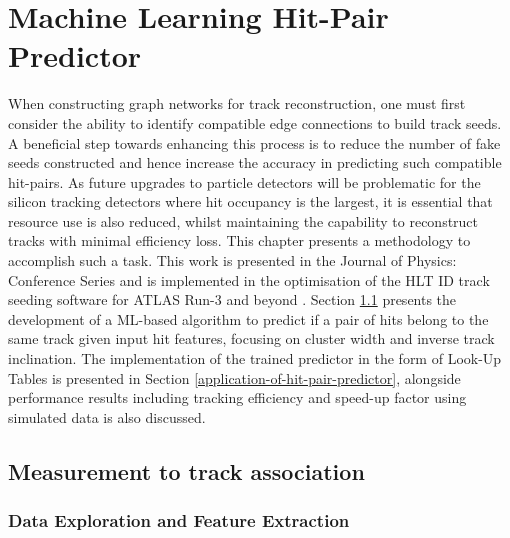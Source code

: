 

\doublespacing
\newpage
\chapter{Machine Learning Hit-Pair Predictor} 
\label{chapter-4}



When constructing graph networks for track reconstruction, one must first consider the ability to identify compatible edge connections to build track seeds. A beneficial step towards enhancing this process is to reduce the number of fake seeds constructed and hence increase the accuracy in predicting such compatible hit-pairs. As future upgrades to particle detectors will be problematic for the silicon tracking detectors where hit occupancy is the largest, it is essential that resource use is also reduced, whilst maintaining the capability to reconstruct tracks with minimal efficiency loss. This chapter presents a methodology to accomplish such a task. This work is presented in the Journal of Physics: Conference Series \cite{Lad_2023} and is implemented in the optimisation of the HLT ID track seeding software for ATLAS Run-3 and beyond \cite{Grandi:2728111, Long:2813981}. Section \ref{measurement-to-track-association} presents the development of a ML-based algorithm to predict if a pair of hits belong to the same track given input hit features, focusing on cluster width and inverse track inclination. The implementation of the trained predictor in the form of Look-Up Tables is presented in Section \ref{application-of-hit-pair-predictor}, alongside performance results including tracking efficiency and speed-up factor using simulated data is also discussed.


\section{Measurement to track association}
\label{measurement-to-track-association}

\subsection{Data Exploration and Feature Extraction}

